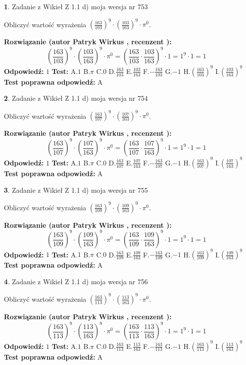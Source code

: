 \documentclass[12pt, a4paper]{article}
\theoremstyle{definition} %
\newtheorem{zad}{}
\newcommand{\zadStart}[1]{\begin{zad}#1\newline}
\newcommand{\zadStop}{\end{zad}}
\newcommand{\rozwStart}[2]{\noindent \textbf{Rozwiązanie (autor #1 , recenzent #2): }\newline}
\newcommand{\rozwStop}{\newline}
\newcommand{\odpStart}{\noindent \textbf{Odpowiedź:}\newline}
\newcommand{\odpStop}{\newline}
\newcommand{\testStart}{\noindent \textbf{Test:}\newline}
\newcommand{\testStop}{\newline}
\newcommand{\kluczStart}{\noindent \textbf{Test poprawna odpowiedź:}\newline}
\newcommand{\kluczStop}{\newline}
\begin{document}
\zadStart{Zadanie z Wikieł Z 1.1 d) moja wersja nr 753}

Obliczyć wartość wyrażenia $(\frac{163}{103})^{9} \cdot (\frac{103}{163})^{9} \cdot \pi^{0}$.
\zadStop
\rozwStart{Patryk Wirkus}{}
$$(\frac{163}{103})^{9} \cdot (\frac{103}{163})^{9} \cdot \pi^{0} = (\frac{163}{103} \cdot \frac{103}{163})^{9} \cdot 1 = 1^{9} \cdot 1 = 1$$
\rozwStop
\odpStart
$1$
\odpStop
\testStart
A.$1$ B.$\pi$ C.$0$ D.$\frac{163}{103}$ E.$\frac{103}{163}$
F.$-\frac{163}{103}$ G.$-1$
H.$(\frac{163}{103})^{9}$
I.$(\frac{103}{163})^{9}$
\testStop
\kluczStart
A
\kluczStop



\zadStart{Zadanie z Wikieł Z 1.1 d) moja wersja nr 754}

Obliczyć wartość wyrażenia $(\frac{163}{107})^{9} \cdot (\frac{107}{163})^{9} \cdot \pi^{0}$.
\zadStop
\rozwStart{Patryk Wirkus}{}
$$(\frac{163}{107})^{9} \cdot (\frac{107}{163})^{9} \cdot \pi^{0} = (\frac{163}{107} \cdot \frac{107}{163})^{9} \cdot 1 = 1^{9} \cdot 1 = 1$$
\rozwStop
\odpStart
$1$
\odpStop
\testStart
A.$1$ B.$\pi$ C.$0$ D.$\frac{163}{107}$ E.$\frac{107}{163}$
F.$-\frac{163}{107}$ G.$-1$
H.$(\frac{163}{107})^{9}$
I.$(\frac{107}{163})^{9}$
\testStop
\kluczStart
A
\kluczStop



\zadStart{Zadanie z Wikieł Z 1.1 d) moja wersja nr 755}

Obliczyć wartość wyrażenia $(\frac{163}{109})^{9} \cdot (\frac{109}{163})^{9} \cdot \pi^{0}$.
\zadStop
\rozwStart{Patryk Wirkus}{}
$$(\frac{163}{109})^{9} \cdot (\frac{109}{163})^{9} \cdot \pi^{0} = (\frac{163}{109} \cdot \frac{109}{163})^{9} \cdot 1 = 1^{9} \cdot 1 = 1$$
\rozwStop
\odpStart
$1$
\odpStop
\testStart
A.$1$ B.$\pi$ C.$0$ D.$\frac{163}{109}$ E.$\frac{109}{163}$
F.$-\frac{163}{109}$ G.$-1$
H.$(\frac{163}{109})^{9}$
I.$(\frac{109}{163})^{9}$
\testStop
\kluczStart
A
\kluczStop



\zadStart{Zadanie z Wikieł Z 1.1 d) moja wersja nr 756}

Obliczyć wartość wyrażenia $(\frac{163}{113})^{9} \cdot (\frac{113}{163})^{9} \cdot \pi^{0}$.
\zadStop
\rozwStart{Patryk Wirkus}{}
$$(\frac{163}{113})^{9} \cdot (\frac{113}{163})^{9} \cdot \pi^{0} = (\frac{163}{113} \cdot \frac{113}{163})^{9} \cdot 1 = 1^{9} \cdot 1 = 1$$
\rozwStop
\odpStart
$1$
\odpStop
\testStart
A.$1$ B.$\pi$ C.$0$ D.$\frac{163}{113}$ E.$\frac{113}{163}$
F.$-\frac{163}{113}$ G.$-1$
H.$(\frac{163}{113})^{9}$
I.$(\frac{113}{163})^{9}$
\testStop
\kluczStart
A
\kluczStop
\end{document}
